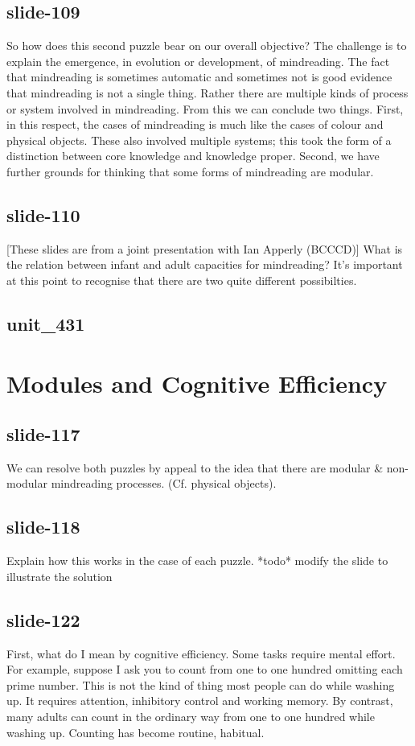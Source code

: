 \documentclass[12pt,\papersize]{extarticle}
\begin{document}
\subsection{slide-109}
So how does this second puzzle bear on our overall objective?
The challenge is to explain the emergence, in evolution or development, of mindreading.
The fact that mindreading is sometimes automatic and sometimes not is good evidence that mindreading is not a single thing.
Rather there are multiple kinds of process or system involved in mindreading.
From this we can conclude two things.
First, in this respect, the cases of mindreading is much like the cases of colour and physical objects.
These also involved multiple systems; this took the form of a distinction between core knowledge and knowledge proper.
Second, we have further grounds for thinking that some forms of mindreading are modular.
 
 
\subsection{slide-110}
[These slides are from a joint presentation with Ian Apperly (BCCCD)]
What is the relation between infant and adult capacities for mindreading?
It's important at this point to recognise that there are two quite different possibilties.
 
 
\subsection{unit\_431}
 
\section{Modules and Cognitive Efficiency}
 
 
\subsection{slide-117}
We can resolve both puzzles by appeal to the idea that there are modular \& non-modular mindreading processes. (Cf. physical objects).
 
 
\subsection{slide-118}
Explain how this works in the case of each puzzle.
*todo* modify the slide to illustrate the solution
 
 
\subsection{slide-122}
First, what do I mean by cognitive efficiency.
Some tasks require mental effort.
For example, suppose I ask you to count from one to one hundred omitting each prime number.
This is not the kind of thing most people can do while washing up.
It requires attention, inhibitory control and working memory.
By contrast, many adults can count in the ordinary way from one to one hundred while washing up.
Counting has become routine, habitual.
 
\end{document}
